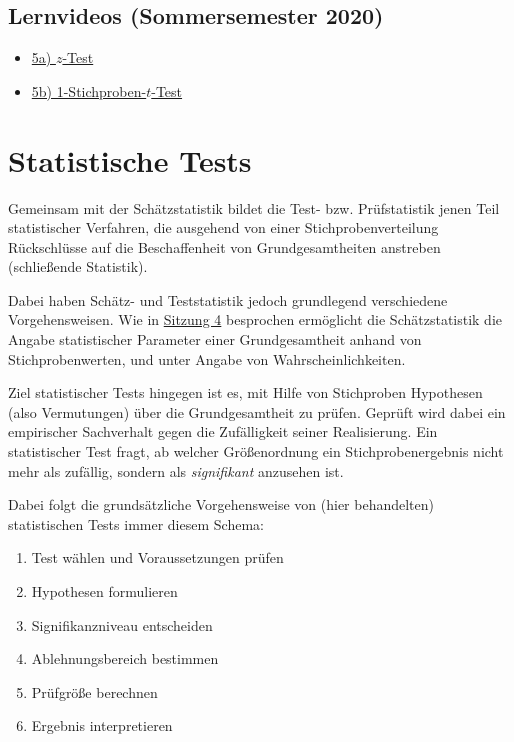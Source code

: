 \documentclass[
  11pt,
  ngerman,
  a4paper,
]{report}
\providecommand{\tightlist}{%
  \setlength{\itemsep}{0pt}\setlength{\parskip}{0pt}}
\begin{document}
\hypertarget{lernvideos-sommersemester-2020}{%
\subsection*{Lernvideos (Sommersemester 2020)}\label{lernvideos-sommersemester-2020}}

\begin{itemize}
\tightlist
\item
  \href{https://video01.uni-frankfurt.de/Mediasite/Play/696f09c79d0b4186b66e040e4377b7601d}{5a) \(z\)-Test}
\item
  \href{https://video01.uni-frankfurt.de/Mediasite/Play/c78e80fbd9fb4073a7f932d3862245da1d}{5b) 1-Stichproben-\(t\)-Test}
\end{itemize}

\hypertarget{statistische-tests}{%
\section{Statistische Tests}\label{statistische-tests}}

Gemeinsam mit der Schätzstatistik bildet die Test- bzw. Prüfstatistik jenen Teil statistischer Verfahren, die ausgehend von einer Stichprobenverteilung Rückschlüsse auf die Beschaffenheit von Grundgesamtheiten anstreben (schließende Statistik).

Dabei haben Schätz- und Teststatistik jedoch grundlegend verschiedene Vorgehensweisen. Wie in \protect\hyperlink{Schuxe4tzstatistik}{Sitzung 4} besprochen ermöglicht die Schätzstatistik die Angabe statistischer Parameter einer Grundgesamtheit anhand von Stichprobenwerten, und unter Angabe von Wahrscheinlichkeiten.

Ziel statistischer Tests hingegen ist es, mit Hilfe von Stichproben Hypothesen (also Vermutungen) über die Grundgesamtheit zu prüfen. Geprüft wird dabei ein empirischer Sachverhalt gegen die Zufälligkeit seiner Realisierung. Ein statistischer Test fragt, ab welcher Größenordnung ein Stichprobenergebnis nicht mehr als zufällig, sondern als \emph{signifikant} anzusehen ist.

Dabei folgt die grundsätzliche Vorgehensweise von (hier behandelten) statistischen Tests immer diesem Schema:

\begin{enumerate}
\def\labelenumi{\arabic{enumi}.}
\tightlist
\item
  Test wählen und Voraussetzungen prüfen
\item
  Hypothesen formulieren
\item
  Signifikanzniveau entscheiden
\item
  Ablehnungsbereich bestimmen
\item
  Prüfgröße berechnen
\item
  Ergebnis interpretieren
\end{enumerate}
\end{document}
